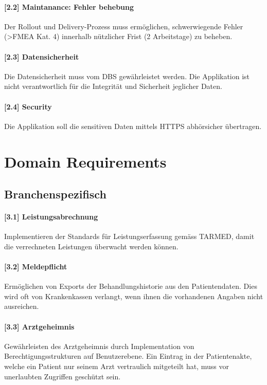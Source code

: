 \documentclass[a4paper]{scrreprt}
\begin{document}
\paragraph{[2.2] Maintanance: Fehler behebung}
Der Rollout und Delivery-Prozess muss ermöglichen, schwerwiegende Fehler (\textgreater FMEA Kat. 4) innerhalb nützlicher Frist (2 Arbeitstage) zu beheben.

\paragraph{[2.3] Datensicherheit}
Die Datensicherheit muss vom DBS gewährleistet werden. Die Applikation ist nicht verantwortlich für die Integrität und Sicherheit jeglicher Daten.
 
\paragraph{[2.4] Security}
Die Applikation soll die sensitiven Daten mittels HTTPS abhörsicher übertragen. 

\section{Domain Requirements}
\subsection{Branchenspezifisch}
\paragraph{[3.1] Leistungsabrechnung} Implementieren der Standards für Leistungserfassung gemäss TARMED, damit die verrechneten Leistungen überwacht werden können.

\paragraph{[3.2] Meldepflicht} Ermöglichen von Exports der Behandlungshistorie aus den Patientendaten. Dies wird oft von Krankenkassen verlangt, wenn ihnen die vorhandenen Angaben nicht ausreichen.

\paragraph{[3.3] Arztgeheimnis} Gewährleisten des Arztgeheimnis durch Implementation von Berechtigungsstrukturen auf Benutzerebene. Ein Eintrag in der Patientenakte, welche ein Patient nur seinem Arzt vertraulich mitgeteilt hat, muss vor unerlaubten Zugriffen geschützt sein.
\end{document}
